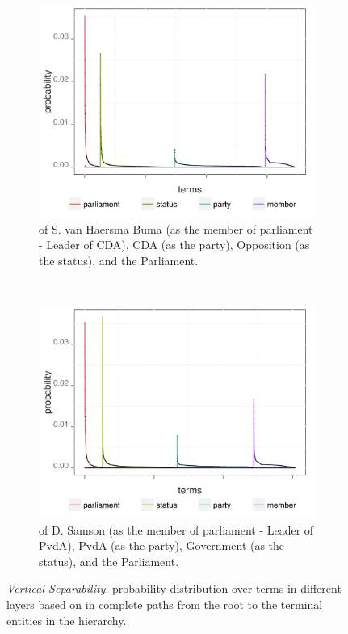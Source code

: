 \begin{figure}[!t]
        \centering
        \begin{subfigure}[b]{0.45\textwidth}
\includegraphics[width=\linewidth]{02-part-01/chapter-03/figs_and_tables/img_nlm02316.png}
\caption{\label{fig:VSO} \achswlm of S. van Haersma Buma (as the member of parliament - Leader of CDA), CDA (as the party), Opposition (as the status), and the Parliament.}
        \end{subfigure}
        ~~~~~~~~
        \begin{subfigure}[b]{0.45\textwidth}
\centering
\includegraphics[width=\linewidth]{02-part-01/chapter-03/figs_and_tables/img_nlm02335.png}
\caption{\label{fig:VSC} \achswlm of D. Samson (as the member of parliament - Leader of PvdA), PvdA (as the party), Government (as the status), and the Parliament.}
        \end{subfigure}
        \caption{\label{fig:VS} \emph{Vertical Separability}: probability distribution over terms in different layers based on \hswlms in complete paths from the root to the terminal entities in the hierarchy.}
\end{figure}

